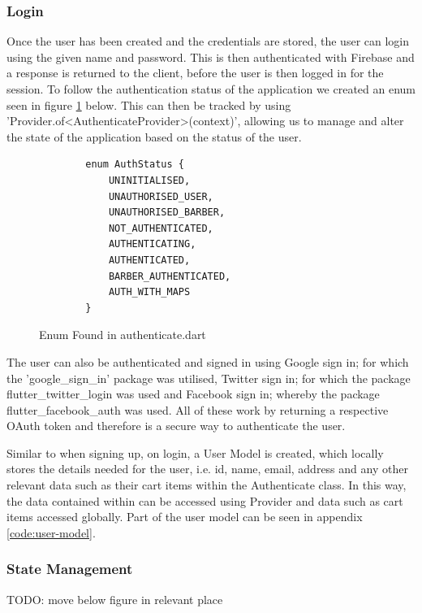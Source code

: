 \documentclass[12pt]{article}
\begin{document}
	
	\subsubsection{Login}
	Once the user has been created and the credentials are stored, the user can login using the given name and password. This is then authenticated with Firebase and a response is returned to the client, before the user is then logged in for the session. To follow the authentication status of the application we created an enum seen in figure \ref{fig:authenticate-enum} below. This can then be tracked by using 'Provider.of<AuthenticateProvider>(context)', allowing us to manage and alter the state of the application based on the status of the user.
	
	\begin{figure}[H]
	\centering
	\label{fig:authenticate-enum}
	\begin{verbatim}
		enum AuthStatus {
			UNINITIALISED,
			UNAUTHORISED_USER,
			UNAUTHORISED_BARBER,
			NOT_AUTHENTICATED,
			AUTHENTICATING,
			AUTHENTICATED,
			BARBER_AUTHENTICATED,
			AUTH_WITH_MAPS
		}
	\end{verbatim}
	\caption{Enum Found in authenticate.dart}
	\end{figure}
	
	The user can also be authenticated and signed in using Google sign in; for which the 'google\_sign\_in' package was utilised, Twitter sign in; for which the package flutter\_twitter\_login was used and Facebook sign in; whereby the package flutter\_facebook\_auth was used. All of these work by returning a respective OAuth token and therefore is a secure way to authenticate the user.
	
	
	Similar to when signing up, on login, a User Model is created, which locally stores the details needed for the user, i.e. id, name, email, address and any other relevant data such as their cart items within the Authenticate class. In this way, the data contained within can be accessed using Provider and data such as cart items accessed globally. Part of the user model can be seen in appendix \ref{code:user-model}.
	
	
	\subsubsection{State Management}
	
	TODO: move below figure in relevant place
	
\end{document}
